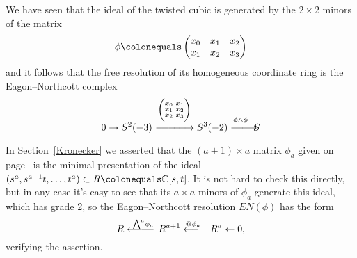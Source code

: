 \begin{example}
We have seen that the ideal of the twisted cubic is generated by the
$2\times 2$ minors of the matrix
$$
\phi \colonequals
\begin{pmatrix}
x_{0}&x_{1}&x_{2}\\
x_{1}&x_{2}&x_{3}
\end{pmatrix}
$$
and it follows that the free resolution of its homogeneous coordinate
ring is the Eagon--Northcott complex
$$
0\to S^{2}(-3)
\hskip1pt
-\hskip-4pt-\hskip-4pt\ruuto {\hskip-13pt\vbox{\hbox{$\biggl(\!\begin{smallmatrix}
x_{0}&x_{1}\\
x_{1}&x_{2}\\
x_{2}&x_{3}
\end{smallmatrix}\!\biggr)$}\vskip0pt}}
S^{3}(-2)
\ruuto {\phi\wedge\phi}
S
$$
\end{example}

\begin{example}\label{res of max ideal power}
In Section~\ref{Kronecker} we asserted that  the $(a+1)\times a$  matrix
$\phi_{a}$ given on page~\pageref{phia}
is the minimal presentation of the ideal $(s^{a},s^{a-1}t, \dots, t^{a})
\subset R\colonequals \CC[s,t]$. It is not hard to check this
directly, but in any case it's easy to see that its $a\times a$ minors of
$\phi_{a}$ generate this ideal, which has grade 2, so the Eagon--Northcott
resolution $EN(\phi)$
has the form
$$
R\luto{\ \ssty\bigwedge^a\!\phi_a}\hskip-23pt-\hskip-4pt-
\hskip2pt R^{a+1} 
\luto{@\phi_{a}} R^{a} \leftarrow 0
,
$$
verifying the assertion.
\end{example}

